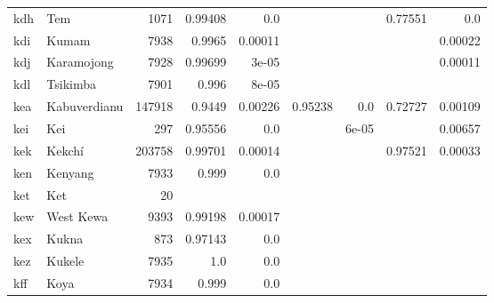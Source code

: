\documentclass[11pt]{article}
\begin{document}
\begin{table*}[h]
{\begin{tabular}{llrrrrrrr}
kdh         & Tem         & 1071         & 0.99408         & 0.0         &          &          & 0.77551         & 0.0         \\

kdi         & Kumam         & 7938         & 0.9965         & 0.00011         &          &          &          & 0.00022         \\

kdj         & Karamojong         & 7928         & 0.99699         & 3e-05         &          &          &          & 0.00011         \\

kdl         & Tsikimba         & 7901         & 0.996         & 8e-05         &          &          &          &          \\

kea         & Kabuverdianu         & 147918         & 0.9449         & 0.00226         & 0.95238         & 0.0         & 0.72727         & 0.00109         \\

kei         & Kei         & 297         & 0.95556         & 0.0         &          & 6e-05         &          & 0.00657         \\

kek         & Kekchí         & 203758         & 0.99701         & 0.00014         &          &          & 0.97521         & 0.00033         \\

ken         & Kenyang         & 7933         & 0.999         & 0.0         &          &          &          &          \\

ket         & Ket         & 20         &          &          &          &          &          &          \\

kew         & West Kewa         & 9393         & 0.99198         & 0.00017         &          &          &          &          \\

kex         & Kukna         & 873         & 0.97143         & 0.0         &          &          &          &          \\

kez         & Kukele         & 7935         & 1.0         & 0.0         &          &          &          &          \\

kff         & Koya         & 7934         & 0.999         & 0.0         &          &          &          &          \\


\end{tabular}}
\end{table*}
\end{document}
